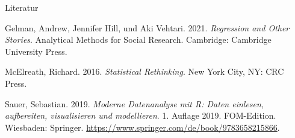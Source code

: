 \documentclass[
  ngerman,
  ignorenonframetext,
]{beamer}
\newlength{\cslhangindent}
\newenvironment{CSLReferences}[2] %
 {%
  \setlength{\parindent}{0pt}
  \ifodd #1 \everypar{\setlength{\hangindent}{\cslhangindent}}\ignorespaces\fi
  \ifnum #2 > 0
  \setlength{\parskip}{#2\baselineskip}
  \fi
 }%
 {}
\begin{document}
\begin{frame}{Literatur}
\protect\hypertarget{literatur}{}
\hypertarget{refs}{}
\begin{CSLReferences}{1}{0}
\leavevmode{}%
Gelman, Andrew, Jennifer Hill, und Aki Vehtari. 2021. \emph{Regression
and Other Stories}. Analytical Methods for Social Research. {Cambridge}:
{Cambridge University Press}.

\leavevmode{}%
McElreath, Richard. 2016. \emph{Statistical {Rethinking}}. {New York
City, NY}: {CRC Press}.

\leavevmode{}%
Sauer, Sebastian. 2019. \emph{Moderne Datenanalyse mit R: Daten
einlesen, aufbereiten, visualisieren und modellieren}. 1. Auflage 2019.
FOM-Edition. {Wiesbaden}: {Springer}.
\url{https://www.springer.com/de/book/9783658215866}.

\end{CSLReferences}
\end{frame}
\end{document}
